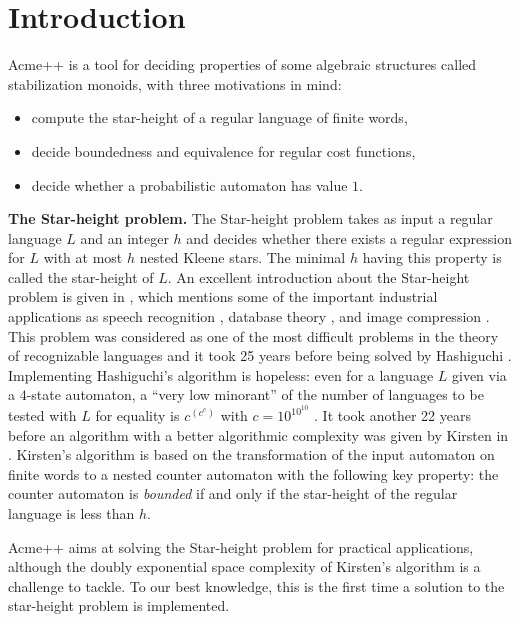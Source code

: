 \section{Introduction}

Acme++ is a tool for deciding properties of some algebraic structures called stabilization monoids,
with three motivations in mind:
\begin{itemize}
\item compute the star-height of a regular language of finite words,
\item decide boundedness and equivalence for regular cost functions,
\item decide whether a probabilistic automaton has value $1$.
\end{itemize}

\textbf{The Star-height problem.} The Star-height problem \cite{Eggan63} takes as input a regular language $L$ and an integer $h$ and decides whether there exists a regular expression for $L$ with at most $h$ nested Kleene stars.
The minimal $h$ having this property is called the star-height of $L$. 
An excellent introduction about the Star-height problem is given in \cite{Kirsten05},
which mentions some of the important industrial applications as
speech recognition \cite{Mohri97}, database theory \cite{GT01}, and image compression \cite{CK93,KMT04}.
This problem was considered as one of the most difficult problems in the theory of recognizable languages
and it took 25 years before being solved by Hashiguchi \cite{Hashiguchi88}.
Implementing Hashiguchi's algorithm is hopeless: even for a language $L$ given via a $4$-state automaton, a ``very low minorant'' of the number of languages to be tested with $L$ for equality is  $ c^{(c^c)}$ with $c=10^{10^{10}}$ \cite{LS02}.
It took another 22 years before an algorithm with a better algorithmic complexity was given by Kirsten in \cite{Kirsten05}. Kirsten's algorithm is based on the transformation of the input automaton on finite words to 
a nested counter automaton with the following key property: the counter automaton is \emph{bounded}
if and only if the star-height of the regular language is less than $h$.

Acme++ aims at solving the Star-height problem for practical applications,
although the doubly exponential space complexity of Kirsten's algorithm is a challenge to tackle.
To our best knowledge, this is the first time a solution to the star-height problem is implemented.

